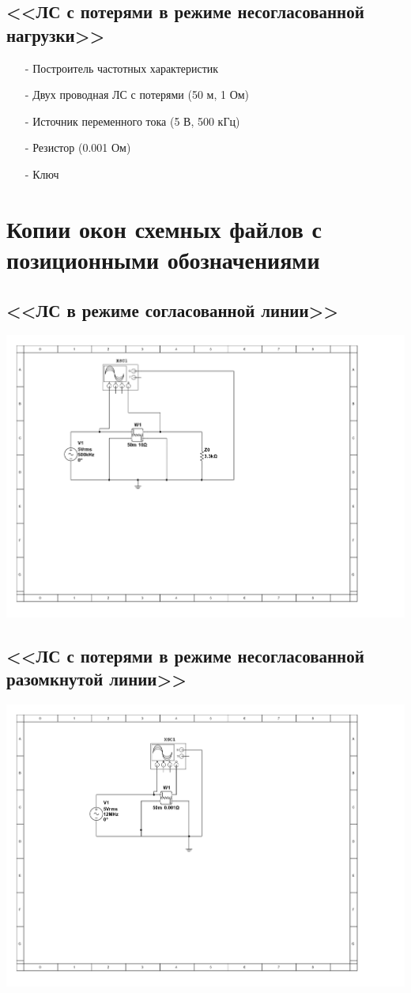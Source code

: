 \documentclass[11pt]{article}
\begin{document}
\subsection{<<ЛС с потерями в режиме несогласованной нагрузки>>}
\begin{itemize}
    \item[-] Построитель частотных характеристик
    \item[-] Двух проводная ЛС с потерями (50 м, 1 Ом)
    \item[-] Источник переменного тока (5 В, 500 кГц)
    \item[-] Резистор (0.001 Ом)
    \item[-] Ключ
\end{itemize}
\section{Копии окон схемных файлов с позиционными
обозначениями}
\subsection{<<ЛС в режиме согласованной линии>>}
\includegraphics[width=1\linewidth]{1/scheme.jpg}
\subsection{<<ЛС с потерями в режиме несогласованной разомкнутой линии>>}
\includegraphics[width=1\linewidth]{2/scheme.jpg}
\end{document}
